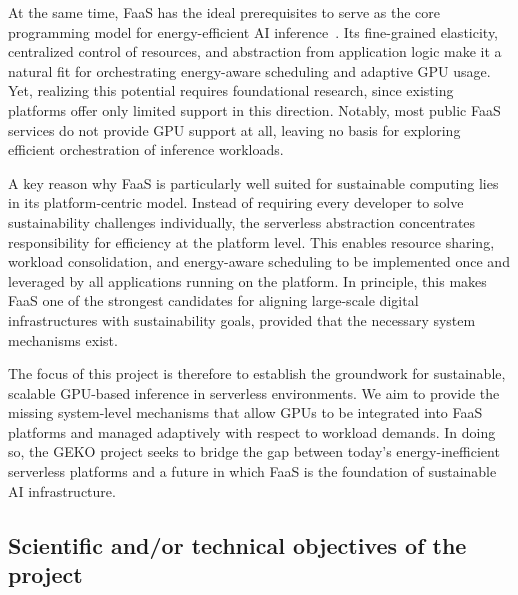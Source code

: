 At the same time, FaaS has the ideal prerequisites to serve as the core programming model for energy-efficient AI inference~\cite{patros_2021_towards_sustainable_serverless}.
Its fine-grained elasticity, centralized control of resources, and abstraction from application logic make it a natural fit for orchestrating energy-aware scheduling and adaptive GPU usage. 
Yet, realizing this potential requires foundational research, since existing platforms offer only limited support in this direction. 
Notably, most public FaaS services do not provide GPU support at all, leaving no basis for exploring efficient orchestration of inference workloads.

A key reason why FaaS is particularly well suited for sustainable computing lies in its platform-centric model.
Instead of requiring every developer to solve sustainability challenges individually, the serverless abstraction concentrates responsibility for efficiency at the platform level.
This enables resource sharing, workload consolidation, and energy-aware scheduling to be implemented once and leveraged by all applications running on the platform.
In principle, this makes FaaS one of the strongest candidates for aligning large-scale digital infrastructures with sustainability goals, provided that the necessary system mechanisms exist.

The focus of this project is therefore to establish the groundwork for sustainable, scalable GPU-based inference in serverless environments.
We aim to provide the missing system-level mechanisms that allow GPUs to be integrated into FaaS platforms and managed adaptively with respect to workload demands.
In doing so, the GEKO project seeks to bridge the gap between today's energy-inefficient serverless platforms and a future in which FaaS is the foundation of sustainable AI infrastructure.


\subsection{Scientific and/or technical objectives of the project}


